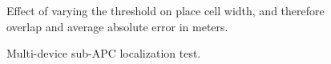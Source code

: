 \begin{figure}[h!]
\centering
\setlength{}
	\setlength{} 
\caption{Effect of varying the threshold on place cell width, and therefore overlap and average absolute error in meters.}
\label{fig:threshEval}
\end{figure}


\begin{figure}
\centering
\setlength{}
	\setlength{}
		
\caption{Multi-device sub-APC localization test.}
\label{fig:multiDevice}
\end{figure}


%		



%	
%
%		


